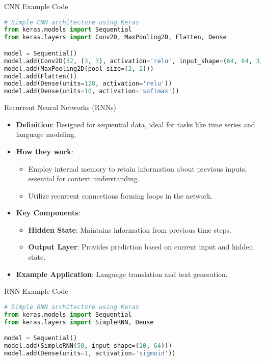 \documentclass[aspectratio=169]{beamer}
\begin{document}
\begin{frame}[fragile]{CNN Example Code}
    \begin{lstlisting}[language=Python]
# Simple CNN architecture using Keras
from keras.models import Sequential
from keras.layers import Conv2D, MaxPooling2D, Flatten, Dense

model = Sequential()
model.add(Conv2D(32, (3, 3), activation='relu', input_shape=(64, 64, 3)))
model.add(MaxPooling2D(pool_size=(2, 2)))
model.add(Flatten())
model.add(Dense(units=128, activation='relu'))
model.add(Dense(units=10, activation='softmax'))
    \end{lstlisting}
\end{frame}

\begin{frame}{Recurrent Neural Networks (RNNs)}
    \begin{itemize}
        \item \textbf{Definition}: Designed for sequential data, ideal for tasks like time series and language modeling.
        \item \textbf{How they work}:
        \begin{itemize}
            \item Employ internal memory to retain information about previous inputs, essential for context understanding.
            \item Utilize recurrent connections forming loops in the network.
        \end{itemize}
        \item \textbf{Key Components}:
        \begin{itemize}
            \item \textbf{Hidden State}: Maintains information from previous time steps.
            \item \textbf{Output Layer}: Provides prediction based on current input and hidden state.
        \end{itemize}
        \item \textbf{Example Application}: Language translation and text generation.
    \end{itemize}
\end{frame}

\begin{frame}[fragile]{RNN Example Code}
    \begin{lstlisting}[language=Python]
# Simple RNN architecture using Keras
from keras.models import Sequential
from keras.layers import SimpleRNN, Dense

model = Sequential()
model.add(SimpleRNN(50, input_shape=(10, 64)))
model.add(Dense(units=1, activation='sigmoid'))
    \end{lstlisting}
\end{frame}
\end{document}
